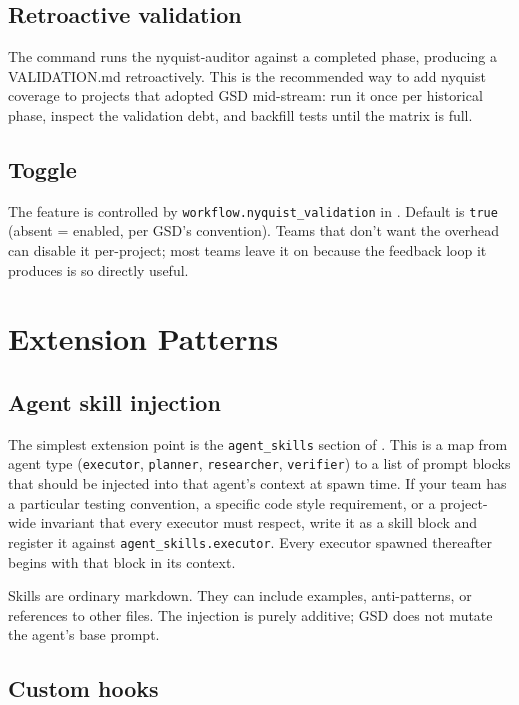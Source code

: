 \documentclass[11pt,letterpaper,openany]{book}
\begin{document}
\section{Retroactive validation}

The  command runs the nyquist-auditor against a completed phase, producing a VALIDATION.md retroactively. This is the recommended way to add nyquist coverage to projects that adopted GSD mid-stream: run it once per historical phase, inspect the validation debt, and backfill tests until the matrix is full.

\section{Toggle}

The feature is controlled by \texttt{workflow.nyquist\_validation} in . Default is \texttt{true} (absent = enabled, per GSD's convention). Teams that don't want the overhead can disable it per-project; most teams leave it on because the feedback loop it produces is so directly useful.

\chapter{Extension Patterns}

\section{Agent skill injection}

The simplest extension point is the \texttt{agent\_skills} section of . This is a map from agent type (\texttt{executor}, \texttt{planner}, \texttt{researcher}, \texttt{verifier}) to a list of prompt blocks that should be injected into that agent's context at spawn time. If your team has a particular testing convention, a specific code style requirement, or a project-wide invariant that every executor must respect, write it as a skill block and register it against \texttt{agent\_skills.executor}. Every executor spawned thereafter begins with that block in its context.

Skills are ordinary markdown. They can include examples, anti-patterns, or references to other files. The injection is purely additive; GSD does not mutate the agent's base prompt.

\section{Custom hooks}
\end{document}
